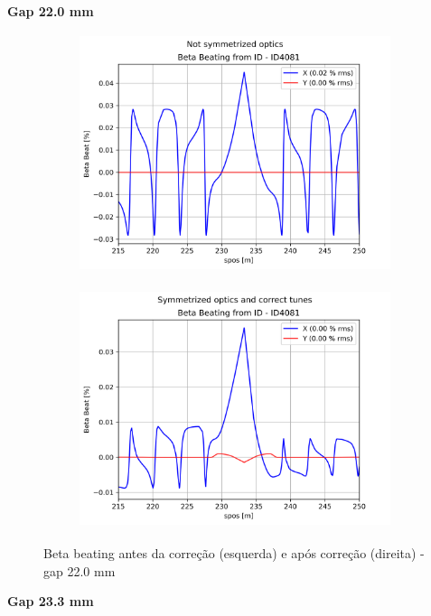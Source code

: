 \documentclass[a4paper,12pt]{article}
\begin{document}
\textbf{Gap 22.0 mm} \\

\begin{figure}[H]
\begin{subfigure}{0.5\textwidth}
\includegraphics[width=0.9\linewidth, height=7cm]{figs/phase-16 gap22 uncorrected-optics.png} 
\label{fig:subim1-1622}
\end{subfigure}
\begin{subfigure}{0.5\textwidth}
\includegraphics[width=0.9\linewidth, height=7cm]{figs/phase-16 gap22 corrected-optics-tunes.png}
\label{fig:subim2-1622}
\end{subfigure}
\caption{Beta beating antes da correção (esquerda) e após correção (direita) - gap 22.0 mm}
\label{fig:bb-16_22}
\end{figure}

\textbf{Gap 23.3 mm} \\
\end{document}
